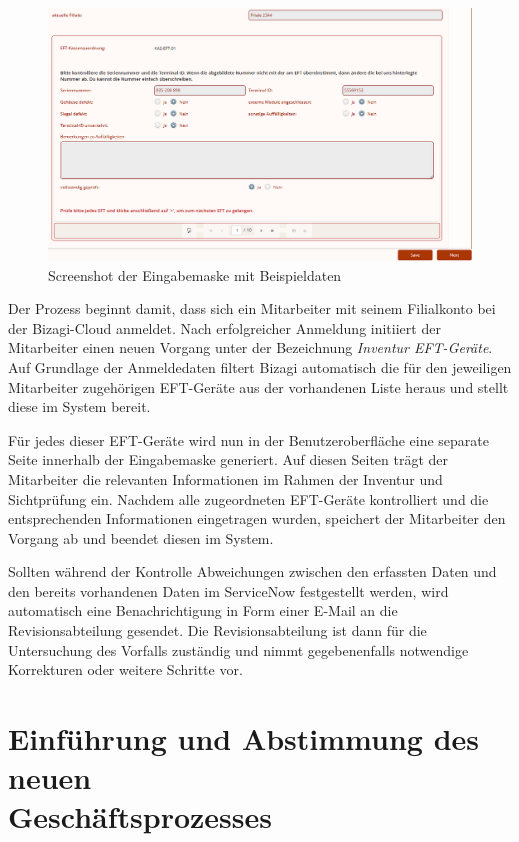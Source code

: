 \documentclass[12pt, a4paper]{article}
\begin{document}
\begin{figure}
    \centering
    \includegraphics[width=\textwidth]{images/eingabemaske.png}
    \caption{Screenshot der Eingabemaske mit Beispieldaten}
    \label{fig:maske}
\end{figure}

Der Prozess beginnt damit, dass sich ein Mitarbeiter mit seinem Filialkonto bei der Bizagi-Cloud anmeldet. Nach erfolgreicher Anmeldung initiiert der Mitarbeiter 
einen neuen Vorgang unter der Bezeichnung \textit{Inventur EFT-Geräte}. Auf Grundlage der Anmeldedaten filtert Bizagi automatisch die für den jeweiligen Mitarbeiter zugehörigen 
EFT-Geräte aus der vorhandenen Liste heraus und stellt diese im System bereit.

Für jedes dieser EFT-Geräte wird nun in der Benutzeroberfläche eine separate Seite innerhalb der Eingabemaske generiert. Auf diesen Seiten trägt der Mitarbeiter 
die relevanten Informationen im Rahmen der Inventur und Sichtprüfung ein. Nachdem alle zugeordneten EFT-Geräte kontrolliert und die entsprechenden Informationen eingetragen 
wurden, speichert der Mitarbeiter den Vorgang ab und beendet diesen im System.

Sollten während der Kontrolle Abweichungen zwischen den erfassten Daten und den bereits vorhandenen Daten im ServiceNow festgestellt werden, wird automatisch eine 
Benachrichtigung in Form einer E-Mail an die Revisionsabteilung gesendet. Die Revisionsabteilung ist dann für die Untersuchung des Vorfalls zuständig und nimmt gegebenenfalls 
notwendige Korrekturen oder weitere Schritte vor.

\section{Einführung und Abstimmung des neuen\\ Geschäftsprozesses}
\end{document}
